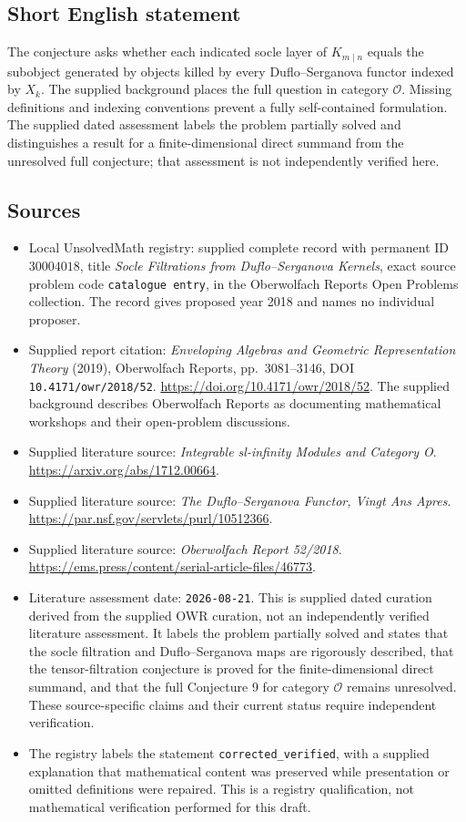\documentclass[11pt]{article}
\begin{document}
\subsection{Short English statement}
The conjecture asks whether each indicated socle layer of \(K_{m\mid n}\) equals the subobject generated by objects killed by every Duflo--Serganova functor indexed by \(X_k\). The supplied background places the full question in category \(\mathcal O\). Missing definitions and indexing conventions prevent a fully self-contained formulation. The supplied dated assessment labels the problem partially solved and distinguishes a result for a finite-dimensional direct summand from the unresolved full conjecture; that assessment is not independently verified here.
\subsection{Sources}
\begin{itemize}
\item Local UnsolvedMath registry: supplied complete record with permanent ID \(30004018\), title \emph{Socle Filtrations from Duflo--Serganova Kernels}, exact source problem code \texttt{catalogue entry}, in the Oberwolfach Reports Open Problems collection. The record gives proposed year 2018 and names no individual proposer.
\item Supplied report citation: \emph{Enveloping Algebras and Geometric Representation Theory} (2019), Oberwolfach Reports, pp.\ 3081--3146, DOI \texttt{10.4171/owr/2018/52}. \url{https://doi.org/10.4171/owr/2018/52}. The supplied background describes Oberwolfach Reports as documenting mathematical workshops and their open-problem discussions.
\item Supplied literature source: \emph{Integrable sl-infinity Modules and Category O}. \url{https://arxiv.org/abs/1712.00664}.
\item Supplied literature source: \emph{The Duflo--Serganova Functor, Vingt Ans Apres}. \url{https://par.nsf.gov/servlets/purl/10512366}.
\item Supplied literature source: \emph{Oberwolfach Report 52/2018}. \url{https://ems.press/content/serial-article-files/46773}.
\item Literature assessment date: \texttt{2026-08-21}. This is supplied dated curation derived from the supplied OWR curation, not an independently verified literature assessment. It labels the problem partially solved and states that the socle filtration and Duflo--Serganova maps are rigorously described, that the tensor-filtration conjecture is proved for the finite-dimensional direct summand, and that the full Conjecture 9 for category \(\mathcal O\) remains unresolved. These source-specific claims and their current status require independent verification.
\item The registry labels the statement \texttt{corrected\_verified}, with a supplied explanation that mathematical content was preserved while presentation or omitted definitions were repaired. This is a registry qualification, not mathematical verification performed for this draft.
\end{itemize}
\end{document}
